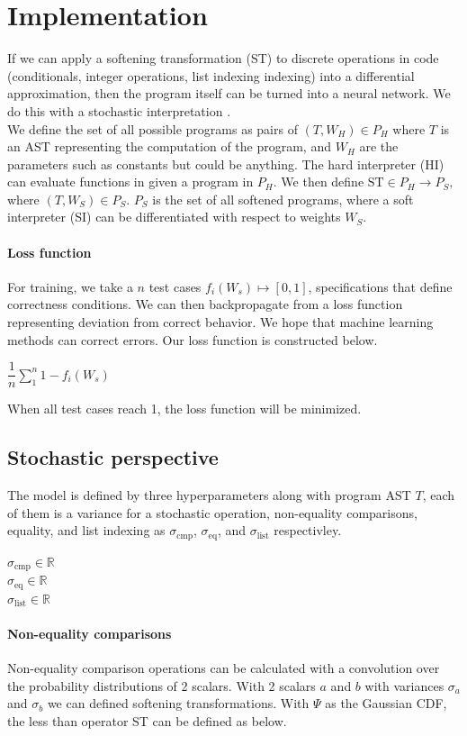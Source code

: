 \documentclass{article}
\begin{document}
\section{Implementation}
If we can apply a softening transformation (ST) to discrete operations in code (conditionals, integer operations, list indexing indexing) into a differential approximation, then the program itself can be turned into a neural network. We do this with a stochastic interpretation \cite{blondel2024elementsdifferentiableprogramming}.\\
We define the set of all possible programs as pairs of $(T, W_H) \in P_H$ where $T$ is an AST representing the computation of the program, and $W_H$ are the parameters such as constants but could be anything. The hard interpreter (HI) can evaluate functions in given a program in $P_H$. We then define $\text{ST} \in P_H \longrightarrow P_S,$ where $(T, W_S) \in P_S$. $P_S$ is the set of all softened programs, where a soft interpreter (SI) can be differentiated with respect to weights $W_S$.\\
\paragraph{Loss function} For training, we take a $n$ test cases $f_i(W_s) \mapsto [0, 1]$,  specifications that define correctness conditions. We can then backpropagate from a loss function representing deviation from correct behavior. We hope that machine learning methods can correct errors. Our loss function is constructed below.
\begin{center}
  $\dfrac{1}{n} \sum_1^n 1 - f_i(W_s)$
\end{center}
When all test cases reach 1, the loss function will be minimized.
\subsection{Stochastic perspective}
The model is defined by three hyperparameters along with program AST $T$, each of them is a variance for a stochastic operation, non-equality comparisons, equality, and list indexing as $\sigma_{\text{cmp}}$, $\sigma_{\text{eq}}$, and $\sigma_{\text{list}}$ respectivley.
\begin{center}
  $\sigma_{\text{cmp}} \in \mathbb{R}$\\
  $\sigma_{\text{eq}} \in \mathbb{R}$\\
  $\sigma_{\text{list}} \in \mathbb{R}$
\end{center}
\paragraph{Non-equality comparisons} Non-equality comparison operations can be calculated with a convolution over the probability distributions of 2 scalars. With 2 scalars $a$ and $b$ with variances $\sigma_a$ and $\sigma_b$ we can defined softening transformations. With $\Psi$ as the Gaussian CDF, the less than operator ST can be defined as below.
\end{document}
